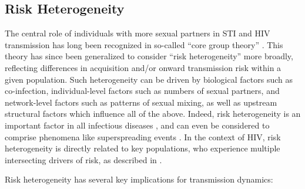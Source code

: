 \subsection{Risk Heterogeneity}\label{intro.model.het}
The central role of individuals with more sexual partners in STI and HIV transmission
has long been recognized in so-called ``core group theory'' \cite{Yorke1978,Stigum1994,Watts2010}.
This theory has since been generalized to consider ``risk heterogeneity'' more broadly,
reflecting differences in acquisition and/or onward transmission risk within a given population.
Such heterogeneity can be driven by
biological factors such as co-infection,
individual-level factors such as numbers of sexual partners, and
network-level factors such as patterns of sexual mixing,
as well as upstream structural factors which influence all of the above. %
Indeed, risk heterogeneity is an important factor in all infectious diseases \cite{Suen2017},
and can even be considered to comprise phenomena like superspreading events \cite{Lloyd-Smith2005}.
In the context of HIV, risk heterogeneity is directly related to key populations,
who experience multiple intersecting drivers of risk, as described in .
\par
Risk heterogeneity has several key implications for transmission dynamics:
